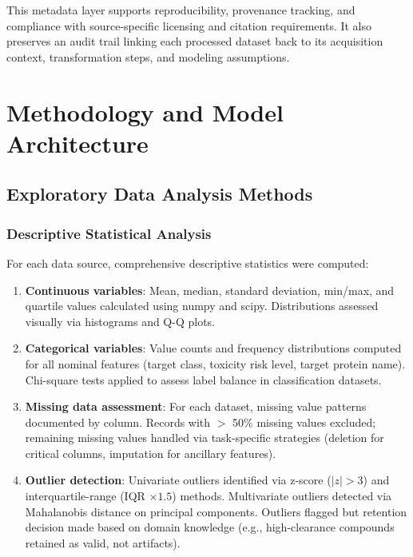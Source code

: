 \documentclass[a4paper,11pt,twoside]{report}
\begin{document}
This metadata layer supports reproducibility, provenance tracking, and compliance with source-specific licensing and citation requirements. It also preserves an audit trail linking each processed dataset back to its acquisition context, transformation steps, and modeling assumptions.

\chapter{Methodology and Model Architecture}

\section{Exploratory Data Analysis Methods}

\subsection{Descriptive Statistical Analysis}

For each data source, comprehensive descriptive statistics were computed:

\begin{enumerate}
\item \textbf{Continuous variables}: Mean, median, standard deviation, min/max, and quartile values calculated using numpy and scipy. Distributions assessed visually via histograms and Q-Q plots.

\item \textbf{Categorical variables}: Value counts and frequency distributions computed for all nominal features (target class, toxicity risk level, target protein name). Chi-square tests applied to assess label balance in classification datasets.

\item \textbf{Missing data assessment}: For each dataset, missing value patterns documented by column. Records with $>$ 50\% missing values excluded; remaining missing values handled via task-specific strategies (deletion for critical columns, imputation for ancillary features).

\item \textbf{Outlier detection}: Univariate outliers identified via z-score ($|z| > 3$) and interquartile-range (IQR $\times 1.5$) methods. Multivariate outliers detected via Mahalanobis distance on principal components. Outliers flagged but retention decision made based on domain knowledge (e.g., high-clearance compounds retained as valid, not artifacts).
\end{enumerate}
\end{document}
